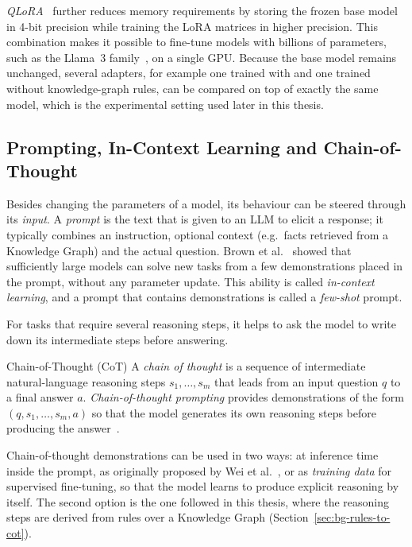 \emph{QLoRA}~\cite{dettmers2023qlora} further reduces memory requirements by
storing the frozen base model in 4-bit precision while training the LoRA
matrices in higher precision. This combination makes it possible to fine-tune
models with billions of parameters, such as the Llama~3
family~\cite{grattafiori2024llama3}, on a single GPU. Because the base model
remains unchanged, several adapters, for example one trained with and one
trained without knowledge-graph rules, can be compared on top of exactly the
same model, which is the experimental setting used later in this thesis.

\subsection{Prompting, In-Context Learning and Chain-of-Thought}
\label{sec:bg-prompting}

Besides changing the parameters of a model, its behaviour can be steered
through its \emph{input}. A \emph{prompt} is the text that is given to an LLM
to elicit a response; it typically combines an instruction, optional
context (e.g.\ facts retrieved from a Knowledge Graph) and the actual
question. Brown et al.~\cite{brown2020language} showed that sufficiently
large models can solve new tasks from a few demonstrations placed in the
prompt, without any parameter update. This ability is called
\emph{in-context learning}, and a prompt that contains demonstrations is
called a \emph{few-shot} prompt.

For tasks that require several reasoning steps, it helps to ask the model to
write down its intermediate steps before answering.

\begin{bgdefinition}{Chain-of-Thought (CoT)}
A \emph{chain of thought} is a sequence of intermediate natural-language
reasoning steps $s_1, \dots, s_m$ that leads from an input question $q$ to a
final answer $a$. \emph{Chain-of-thought prompting} provides demonstrations
of the form $(q, s_1, \dots, s_m, a)$ so that the model generates its own
reasoning steps before producing the answer~\cite{wei2022chain}.
\end{bgdefinition}

Chain-of-thought demonstrations can be used in two ways: at inference time
inside the prompt, as originally proposed by Wei et al.~\cite{wei2022chain},
or as \emph{training data} for supervised fine-tuning, so that the model
learns to produce explicit reasoning by itself. The second option is the one
followed in this thesis, where the reasoning steps are derived from rules
over a Knowledge Graph (Section~\ref{sec:bg-rules-to-cot}).

